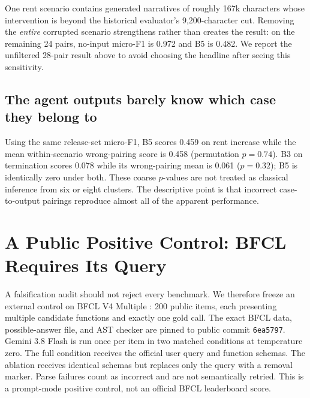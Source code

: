 \documentclass{article}
\begin{document}
\begin{table}[t]
\centering\small
\caption{All policies predict the same object: the gold release set. No-input policies are selected on other scenarios only. ``Best agent'' is selected only for display, not used for inference.}
\label{tab:core}
\resizebox{\linewidth}{!}{}
\end{table}

One rent scenario contains generated narratives of roughly 167k characters whose intervention is beyond the historical evaluator's 9,200-character cut. Removing the \emph{entire} corrupted scenario strengthens rather than creates the result: on the remaining 24 pairs, no-input micro-F1 is 0.972 and B5 is 0.482. We report the unfiltered 28-pair result above to avoid choosing the headline after seeing this sensitivity.

\subsection{The agent outputs barely know which case they belong to}
Using the same release-set micro-F1, B5 scores 0.459 on rent increase while the mean within-scenario wrong-pairing score is 0.458 (permutation $p=0.74$). B3 on termination scores 0.078 while its wrong-pairing mean is 0.061 ($p=0.32$); B5 is identically zero under both. These coarse $p$-values are not treated as classical inference from six or eight clusters. The descriptive point is that incorrect case-to-output pairings reproduce almost all of the apparent performance.

\section{A Public Positive Control: BFCL Requires Its Query}
A falsification audit should not reject every benchmark. We therefore freeze an external control on BFCL V4 Multiple \citep{patil2025bfcl}: 200 public items, each presenting multiple candidate functions and exactly one gold call. The exact BFCL data, possible-answer file, and AST checker are pinned to public commit \texttt{6ea5797}. Gemini 3.8 Flash is run once per item in two matched conditions at temperature zero. The full condition receives the official user query and function schemas. The ablation receives identical schemas but replaces only the query with a removal marker. Parse failures count as incorrect and are not semantically retried. This is a prompt-mode positive control, not an official BFCL leaderboard score.
\end{document}

